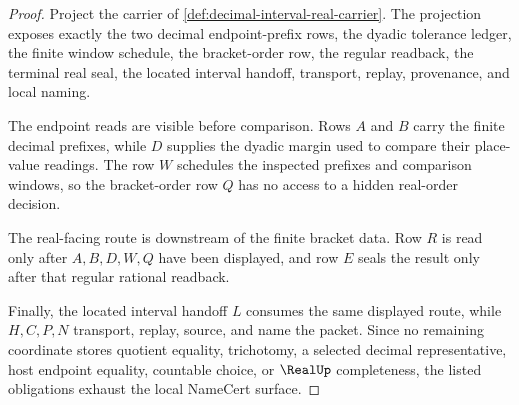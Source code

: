 \begin{proof}
Project the carrier of \autoref{def:decimal-interval-real-carrier}. The projection exposes exactly the two decimal endpoint-prefix rows, the dyadic tolerance ledger, the finite window schedule, the bracket-order row, the regular readback, the terminal real seal, the located interval handoff, transport, replay, provenance, and local naming.

The endpoint reads are visible before comparison. Rows $A$ and $B$ carry the finite decimal prefixes, while $D$ supplies the dyadic margin used to compare their place-value readings. The row $W$ schedules the inspected prefixes and comparison windows, so the bracket-order row $Q$ has no access to a hidden real-order decision.

The real-facing route is downstream of the finite bracket data. Row $R$ is read only after $A,B,D,W,Q$ have been displayed, and row $E$ seals the result only after that regular rational readback.

Finally, the located interval handoff $L$ consumes the same displayed route, while $H,C,P,N$ transport, replay, source, and name the packet. Since no remaining coordinate stores quotient equality, trichotomy, a selected decimal representative, host endpoint equality, countable choice, or $\RealUp$ completeness, the listed obligations exhaust the local NameCert surface.
\end{proof}

